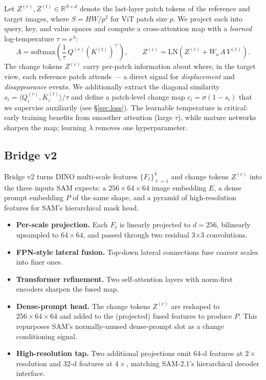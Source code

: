 Let $Z^{(r)}, Z^{(t)} \in \mathbb{R}^{S\times d}$ denote the last-layer patch
tokens of the reference and target images, where $S = HW/p^2$ for ViT patch
size $p$. We project each into query, key, and value spaces and compute a
cross-attention map with a \emph{learned} log-temperature $\tau = e^{\lambda}$:
\begin{equation}
  A = \mathrm{softmax}\!\left(\frac{1}{\tau}\, Q^{(r)} (K^{(t)})^\top\right),
  \qquad Z^{(c)} = \mathrm{LN}\!\left(Z^{(r)} + W_o\, A\, V^{(t)}\right).
\end{equation}
The change tokens $Z^{(c)}$ carry per-patch information about where, in the
target view, each reference patch attends --- a direct signal for
\emph{displacement} and \emph{disappearance} events. We additionally extract
the diagonal similarity $s_i = \langle Q^{(r)}_i, K^{(t)}_i \rangle / \tau$ and
define a patch-level change map $c_i = \sigma(1 - s_i)$ that we supervise
auxiliarily (see \S\ref{sec:loss}). The learnable temperature is critical:
early training benefits from smoother attention (large $\tau$), while mature
networks sharpen the map; learning $\lambda$ removes one hyperparameter.

\subsection{Bridge v2}
\label{sec:bridge}

Bridge v2 turns DINO multi-scale features $\{F_\ell\}_{\ell=1}^4$ and change
tokens $Z^{(c)}$ into the three inputs SAM expects: a $256{\times}64{\times}64$
image embedding $E$, a dense prompt embedding $P$ of the same shape, and a
pyramid of high-resolution features for SAM's hierarchical mask head.

\begin{itemize}
  \item \textbf{Per-scale projection.} Each $F_\ell$ is linearly projected to
    $d=256$, bilinearly upsampled to $64\times 64$, and passed through two
    residual 3$\times$3 convolutions.
  \item \textbf{FPN-style lateral fusion.} Top-down lateral connections fuse
    coarser scales into finer ones.
  \item \textbf{Transformer refinement.} Two self-attention layers with
    norm-first encoders sharpen the fused map.
  \item \textbf{Dense-prompt head.} The change tokens $Z^{(c)}$ are reshaped to
    $256{\times}64{\times}64$ and added to the (projected) fused features to
    produce $P$. This repurposes SAM's normally-unused dense-prompt slot as a
    change conditioning signal.
  \item \textbf{High-resolution tap.} Two additional projections emit 64-d
    features at $2\times$ resolution and 32-d features at $4\times$, matching
    SAM-2.1's hierarchical decoder interface.
\end{itemize}

